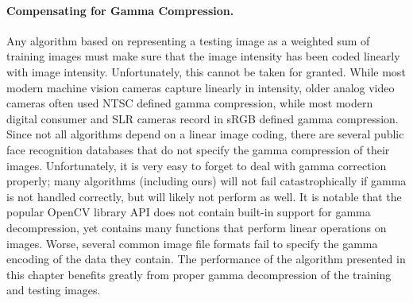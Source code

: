 
\paragraph{Compensating for Gamma Compression.}
Any algorithm based on representing a testing image as a weighted sum of training images must make sure that the image intensity has been coded linearly with image intensity.  Unfortunately, this cannot be taken for granted.  While most modern machine vision cameras capture linearly in intensity, older analog video cameras often used NTSC defined gamma compression, while most modern digital consumer and SLR cameras record in sRGB defined gamma compression.  Since not all algorithms depend on a linear image coding, there are several public face recognition databases that do not specify the gamma compression of their images.  Unfortunately, it is very easy to forget to deal with gamma correction properly; many algorithms (including ours) will not fail catastrophically if gamma is not handled correctly, but will likely not perform as well.  It is notable that the popular OpenCV library API does not contain built-in support for gamma decompression, yet contains many functions that perform linear operations on images.  Worse, several common image file formats fail to specify the gamma encoding of the data they contain.  The performance of the algorithm presented in this chapter benefits greatly from proper gamma decompression of the training and testing images.  

